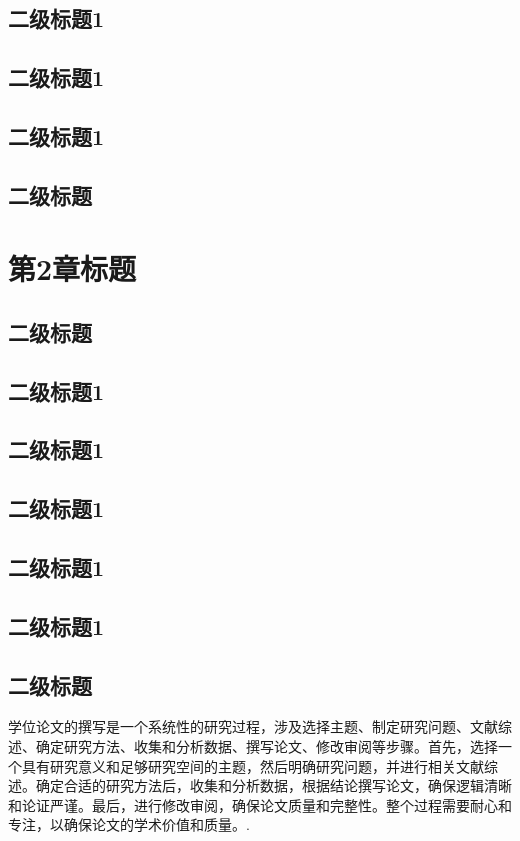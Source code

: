 \documentclass[master,academic]{ysuthesis} %
\begin{document}
	\section{二级标题1}
	\section{二级标题1}
	\section{二级标题1}
	\section{二级标题}
	\chapter{第2章标题}
	\section{二级标题}
	\section{二级标题1}
	\section{二级标题1}
	\section{二级标题1}
	\section{二级标题1}
	\section{二级标题1}
	\section{二级标题}


		学位论文的撰写是一个系统性的研究过程，涉及选择主题、制定研究问题、文献综述、确定研究方法、收集和分析数据、撰写论文、修改审阅等步骤。首先，选择一个具有研究意义和足够研究空间的主题，然后明确研究问题，并进行相关文献综述。确定合适的研究方法后，收集和分析数据，根据结论撰写论文，确保逻辑清晰和论证严谨。最后，进行修改审阅，确保论文质量和完整性。整个过程需要耐心和专注，以确保论文的学术价值和质量。\cite{10900256}.
\end{document}
